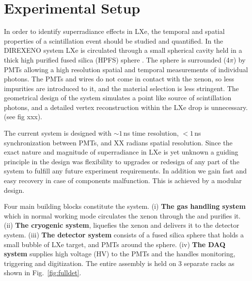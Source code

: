 \section{Experimental Setup}
\label{expSetup}


In order to identify superradiance effects in LXe, the temporal and spatial properties of a scintillation event should be studied and quantified. In the DIREXENO system LXe is circulated through a small spherical cavity held in a thick high purified fused silica (HPFS) sphere . The sphere is surrounded (4$\pi$) by PMTs allowing a high resolution spatial and temporal measurements of individual photons. The PMTs and wires do not come in contact with the xenon, so less impurities are introduced to it, and the material selection is less stringent. The geometrical design of the system simulates a point like source of scintillation photons, and a detailed vertex reconstruction within the LXe drop is unnecessary.  (see fig xxx). 




The current system is designed with  $\sim1$\,ns time resolution, $<1$\,ns synchronization between PMTs, and XX radians spatial resolution. Since the exact nature and magnitude of superradiance in LXe is yet unknown a guiding principle in the design was flexibility to upgrades or redesign of any part of the system to fulfill any future experiment requirements. In addition we gain fast and easy recovery in case of components malfunction. This is achieved by a modular design. 

Four main building blocks constitute the system. (i) \textbf{The gas handling system} which in normal working mode circulates the xenon through the  and  purifies it. (ii) \textbf{The cryogenic system}, liquefies the xenon and 
delivers it to the detector system. (iii) \textbf{The detector system} consists of a fused silica sphere that 
holds a small bubble of LXe target, and PMTs around the sphere. (iv) \textbf{The DAQ system} supplies high voltage (HV) 
to the PMTs and the handles monitoring, triggering and digitization. The entire assembly is held on 3 separate racks as shown in Fig.~\ref{fig:fulldet}.
 
